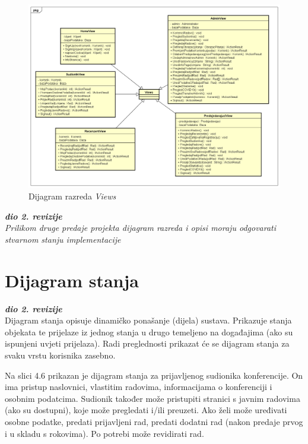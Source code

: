 				\newpage

				\begin{figure}[H]
					\includegraphics[width= 15 cm, keepaspectratio]{dijagrami/DijagramRazredaViews.png} 
					\centering
					\caption{Dijagram razreda \textit{Views} }
					\label{fig:DijagramViews}
				\end{figure}
				
			
			\textbf{\textit{dio 2. revizije}}\\			
			
			\textit{Prilikom druge predaje projekta dijagram razreda i opisi moraju odgovarati stvarnom stanju implementacije}
			
			
			
			\eject
		
		\section{Dijagram stanja}
			
			
			\textbf{\textit{dio 2. revizije}}\\
			
			
			Dijagram stanja opisuje dinamičko ponašanje (dijela) sustava. Prikazuje stanja objekata te prijelaze iz jednog stanja u drugo temeljeno na događajima (ako su ispunjeni uvjeti prijelaza).
			Radi preglednosti prikazat će se dijagram stanja za svaku vrstu korisnika zasebno.
			
			Na slici 4.6 prikazan je dijagram stanja za prijavljenog sudionika konferencije. On ima pristup naslovnici, vlastitim radovima, informacijama o konferenciji i osobnim podatcima. Sudionik također može pristupiti stranici s javnim radovima (ako su dostupni), koje može pregledati i/ili preuzeti. Ako želi može uređivati osobne podatke, predati prijavljeni rad, predati dodatni rad (nakon predaje prvog i u skladu s rokovima). Po potrebi može revidirati rad.
			
